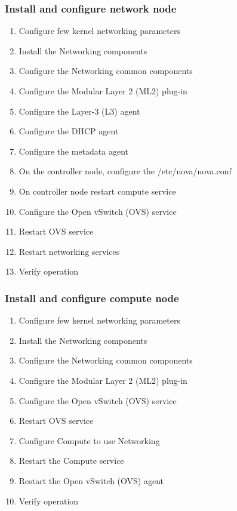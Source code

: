     \subsubsection{Install and configure network node}
        \begin{enumerate}
            \item Configure few kernel networking parameters
            \item Install the Networking components
            \item Configure the Networking common components 
            \item Configure the Modular Layer 2 (ML2) plug-in 
            \item Configure the Layer-3 (L3) agent 
            \item Configure the DHCP agent 
            \item Configure the metadata agent 
            \item On the controller node, configure the /etc/nova/nova.conf
            \item On controller node restart compute service
            \item Configure the Open vSwitch (OVS) service
            \item Restart OVS service
            \item Restart networking services
            \item Verify operation
        \end{enumerate}   
    \subsubsection{Install and configure compute node}
        \begin{enumerate}
            \item Configure few kernel networking parameters
            \item Install the Networking components
            \item Configure the Networking common components 
            \item Configure the Modular Layer 2 (ML2) plug-in 
            \item Configure the Open vSwitch (OVS) service
            \item Restart OVS service
            \item Configure Compute to use Networking
            \item Restart the Compute service
            \item Restart the Open vSwitch (OVS) agent
            \item Verify operation
        \end{enumerate}   
